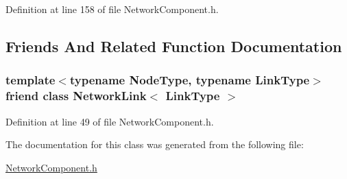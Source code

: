 Definition at line 158 of file Network\+Component.\+h.



\subsection{Friends And Related Function Documentation}
\hypertarget{classmodel_1_1_network_component_adabe2abbcc416a859b6d2afa22480684}{}
\subsubsection[{Network\+Link$<$ Link\+Type $>$}]{\setlength{\rightskip}{0pt plus 5cm}template$<$typename Node\+Type, typename Link\+Type$>$ friend class {\bf Network\+Link}$<$ {\bf Link\+Type} $>$\hspace{0.3cm}{\ttfamily [friend]}}\label{classmodel_1_1_network_component_adabe2abbcc416a859b6d2afa22480684}


Definition at line 49 of file Network\+Component.\+h.



The documentation for this class was generated from the following file\+:\begin{DoxyCompactItemize}
\item 
\hyperlink{_network_component_8h}{Network\+Component.\+h}\end{DoxyCompactItemize}
